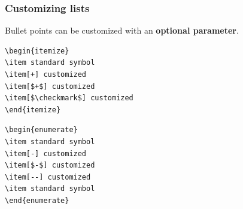 \begin{frame}[fragile]
\frametitle{Customizing lists}

\noindent Bullet points can be customized with an \textbf{optional parameter}.

\begin{multicols}{2}

\begin{lstlisting}
\begin{itemize}
\item standard symbol
\item[+] customized
\item[$+$] customized
\item[$\checkmark$] customized
\end{itemize}
\end{lstlisting}

\columnbreak{}

\end{multicols}

\begin{multicols}{2}

\begin{lstlisting}
\begin{enumerate}
\item standard symbol
\item[-] customized
\item[$-$] customized
\item[--] customized
\item standard symbol
\end{enumerate}
\end{lstlisting}

\columnbreak{}


\end{multicols}

\end{frame}


